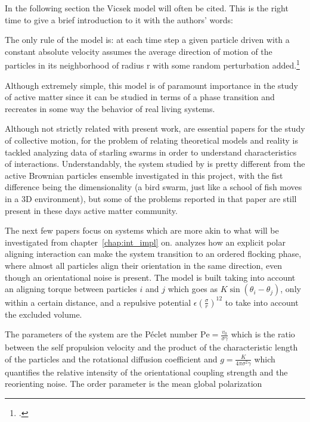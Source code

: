 \documentclass[../../master_thesis_np.tex]{subfiles}
\begin{document}
	In the following section the Vicsek model will often be cited. This is the right time to give a brief introduction to it with the authors' words:
	 \begin{displayquote}
		The only rule of the model is: at each time step a given particle driven with a constant absolute velocity assumes the average direction of motion of the particles in its neighborhood of radius r with some random perturbation added.\footcite{vicsek_novel_1995}
	 \end{displayquote}
	 Although extremely simple, this model is of paramount importance in the study of active matter since it can be studied in terms of a phase transition and recreates in some way the behavior of real living systems.
	
	Although not strictly related with present work,\parencite{cavagna_empirical_2010, ballerini_interaction_2008} are essential papers for the study of collective motion, for the problem of relating theoretical models and reality is tackled analyzing data of starling swarms in order to understand characteristics of interactions. Understandably, the system studied by \citeauthor{cavagna_empirical_2010, ballerini_interaction_2008} is pretty different from the active Brownian particles ensemble investigated in this project, with the fist difference being the dimensionality (a bird swarm, just like a school of fish moves in a 3D environment), but some of the problems reported in that paper are still present in these days active matter community.
	
	The next few papers focus on systems which are more akin to what will be investigated from chapter~\ref{chap:int_impl} on. \parencite{martin-gomez_collective_2018} analyzes how an explicit polar aligning interaction can make the system transition to an ordered flocking phase, where almost all particles align their orientation in the same direction, even though an orientational noise is present. The model is built taking into account an aligning torque between particles $i$ and $j$ which goes as $K \sin{(\theta_{i} - \theta_{j})}$, only within a certain distance, and a repulsive potential $\epsilon \left(\frac{\sigma}{r}\right)^{12}$ to take into account the excluded volume.
	
	The parameters of the system are the Péclet number $\mathrm{Pe} = \frac{v_0}{\sigma \gamma}$ which is the ratio between the self propulsion velocity and the product of the characteristic length of the particles and the rotational diffusion coefficient and $g = \frac{K}{4\pi \sigma^2 \gamma}$ which quantifies the relative intensity of the orientational coupling strength and the reorienting noise. The order parameter is the mean global polarization
	
\end{document}
